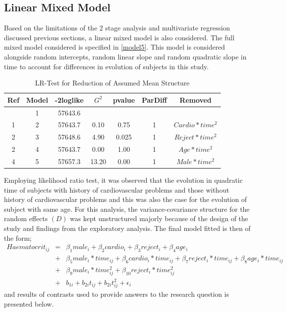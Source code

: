 \documentclass[11pt]{article}
\begin{document}
\subsection{Linear Mixed Model}
Based on the limitations of the 2 stage analysis and multivariate regression discussed previous sections, a linear mixed model is also considered. The full mixed model considered is specified in \ref{model5}. This model is considered alongside random intercepts, random linear slope and random quadratic slope in time to account for differences in evolution of subjects in this study.

\begin{table}[H]
\centering
\begin{tabular}{ccccccc}
\hline
Ref & Model & -2loglike & $G^2$ & pvalue & ParDiff & Removed\\
\hline
 & 1 & 57643.6 &  & & \\
1 & 2 & 57643.7 & 0.10 & 0.75 & 1 & $Cardio*time^2$\\
2 & 3 & 57648.6 & 4.90 & 0.025 & 1 & $Reject*time^2$\\
2 & 4 & 57643.7 & 0.00 & 1.00 & 1 & $Age*time^2$\\
4 & 5 & 57657.3 & 13.20 & 0.00 & 1 & $Male*time^2$\\
\hline
\end{tabular}
\caption{LR-Test for Reduction of Assumed Mean Structure}
\end{table}

Employing likelihood ratio test, it was observed that the evolution in quadratic time of subjects with history of cardiovascular problems and those without history of cardiovascular problems and this was also the case for the evolution of subject with same age. For this analysis, the variance-covariance structure for the random effects $(D)$ was kept unstructured majorly because of the design of the study and findings from the exploratory analysis. The final model fitted is then of the form;
\begin{eqnarray*}
Haematocrit_{ij} &=& \beta_{1}male_{i} + \beta_{2}cardio_{i} + \beta_{3}reject_{i} + \beta_{4}age_{i} \\
&+& \beta_{5}male_{i}*time_{ij} + \beta_{6}cardio_{i}*time_{ij} +  \beta_{7}reject_{i}*time_{ij} + \beta_{8}age_{i}*time_{ij} \\
&+& \beta_{9}male_{i}*time^2_{ij} + \beta_{10}reject_{i}*time^2_{ij}\\
&+& b_{1i} + b_{2i}t_{ij} + b_{2i}t_{ij}^2 + \epsilon_{i}
\end{eqnarray*}
and results of contrasts used to provide answers to the research question is presented below.
\end{document}

